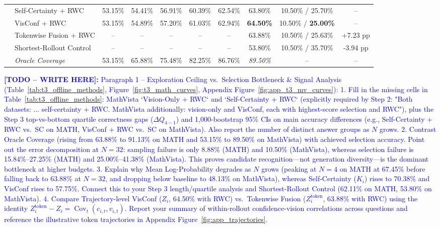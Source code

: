 \documentclass{article}
\newcommand{\writetodo}[1]{\noindent\textcolor{blue}{\textbf{[TODO -- WRITE HERE]:} #1}\par\medskip}
\begin{document}
\begin{table}[htbp]
{\begin{tabular}{llcccccccc}
        & Self-Certainty + RWC & 53.15\% & 54.41\% & 56.91\% & 60.39\% & 62.54\% & 63.80\% & 10.50\% / 25.70\% & -- \\
        & VisConf + RWC & 53.15\% & 54.89\% & 57.20\% & 61.03\% & 62.94\% & \textbf{64.50\%} & 10.50\% / \textbf{25.00\%} & -- \\
        & Tokenwise Fusion + RWC & -- & -- & -- & -- & -- & 63.88\% & 10.50\% / 25.63\% & +7.23 pp \\
        & Shortest-Rollout Control & -- & -- & -- & -- & -- & 53.80\% & 10.50\% / 35.70\% & -3.94 pp \\
        & \textit{Oracle Coverage} & 53.15\% & 65.88\% & 75.48\% & 82.25\% & 86.76\% & \textit{89.50\%} & -- & -- \\
        \bottomrule
    \end{tabular}%
    }
\end{table}

\writetodo{Paragraph 1 -- Exploration Ceiling vs.\ Selection Bottleneck & Signal Analysis (Table~\ref{tab:t3_offline_methods}, Figure~\ref{fig:t3_math_curves}, Appendix Figure~\ref{fig:app_t3_mv_curves}):
1. Fill in the missing cells in Table~\ref{tab:t3_offline_methods}: MathVista `Vision-Only + RWC` and `Self-Certainty + RWC` (explicitly required by Step 2: "Both datasets: ... self-certainty + RWC. MathVista additionally: vision-only and VisConf, each with highest-score selection and RWC"), plus the Step 3 top-vs-bottom quartile correctness gaps ($\Delta Q_{4-1}$) and 1,000-bootstrap 95\% CIs on main accuracy differences (e.g., Self-Certainty + RWC vs.\ SC on MATH, VisConf + RWC vs.\ SC on MathVista). Also report the number of distinct answer groups as $N$ grows.
2. Contrast Oracle Coverage (rising from 63.88\% to 91.13\% on MATH and 53.15\% to 89.50\% on MathVista) with achieved selection accuracy. Point out the error decomposition at $N=32$: sampling failure is only 8.88\% (MATH) and 10.50\% (MathVista), whereas selection failure is 15.84\%--27.25\% (MATH) and 25.00\%--41.38\% (MathVista). This proves candidate recognition---not generation diversity---is the dominant bottleneck at higher budgets.
3. Explain why Mean Log-Probability degrades as $N$ grows (peaking at $N=4$ on MATH at 67.45\% before falling back to 63.88\% at $N=32$, and dropping below baseline to 48.13\% on MathVista), whereas Self-Certainty ($K_i$) rises to 70.38\% and VisConf rises to 57.75\%. Connect this to your Step 3 length/quartile analysis and Shortest-Rollout Control (62.11\% on MATH, 53.80\% on MathVista).
4. Compare Trajectory-level VisConf ($Z_i$, 64.50\% with RWC) vs.\ Tokenwise Fusion ($Z_i^{\text{token}}$, 63.88\% with RWC) using the identity $Z_i^{\text{token}} - Z_i = \operatorname{Cov}_t(c_{i,t}, v_{i,t})$. Report your summary of within-rollout confidence-vision correlations across questions and reference the illustrative token trajectories in Appendix Figure~\ref{fig:app_trajectories}.}
\end{document}
